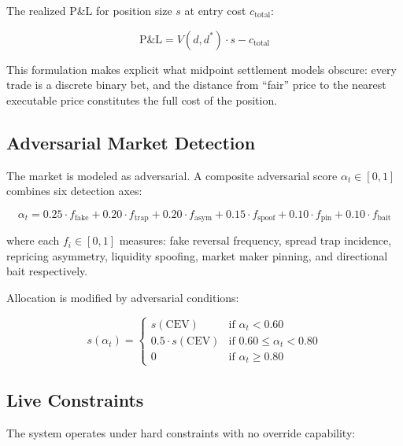 \documentclass[11pt,a4paper]{article}
\begin{document}
The realized P\&L for position size $s$ at entry cost $c_{\text{total}}$:

\begin{equation}\label{eq:pnl}
    \text{P\&L} = V(d, d^*) \cdot s - c_{\text{total}}
\end{equation}

This formulation makes explicit what midpoint settlement models obscure: every trade is a discrete binary bet, and the distance from ``fair'' price to the nearest executable price constitutes the full cost of the position.

\subsection{Adversarial Market Detection}

The market is modeled as adversarial. A composite adversarial score $\alpha_t \in [0, 1]$ combines six detection axes:

\begin{equation}\label{eq:adversarial}
    \alpha_t = 0.25 \cdot f_{\text{fake}} + 0.20 \cdot f_{\text{trap}} + 0.20 \cdot f_{\text{asym}} + 0.15 \cdot f_{\text{spoof}} + 0.10 \cdot f_{\text{pin}} + 0.10 \cdot f_{\text{bait}}
\end{equation}

\noindent where each $f_i \in [0, 1]$ measures: fake reversal frequency, spread trap incidence, repricing asymmetry, liquidity spoofing, market maker pinning, and directional bait respectively.

Allocation is modified by adversarial conditions:

\begin{equation}\label{eq:adversarial_allocation}
    s(\alpha_t) = \begin{cases}
        s(\text{CEV}) & \text{if } \alpha_t < 0.60 \\
        0.5 \cdot s(\text{CEV}) & \text{if } 0.60 \leq \alpha_t < 0.80 \\
        0 & \text{if } \alpha_t \geq 0.80
    \end{cases}
\end{equation}

\subsection{Live Constraints}

The system operates under hard constraints with no override capability:
\end{document}
